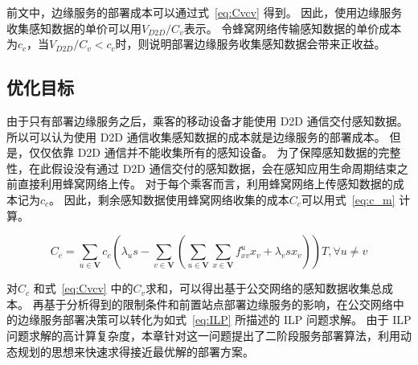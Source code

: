 前文中，边缘服务的部署成本可以通过式~\eqref{eq:Cvcv} 得到。
因此，使用边缘服务收集感知数据的单价可以用$V_{D2D}/C_v$表示。
令蜂窝网络传输感知数据的单价成本为$c_c$，当$V_{D2D}/C_v < c_c$时，则说明部署边缘服务收集感知数据会带来正收益。

\subsection{优化目标}

由于只有部署边缘服务之后，乘客的移动设备才能使用 D2D 通信交付感知数据。
所以可以认为使用 D2D 通信收集感知数据的成本就是边缘服务的部署成本。
但是，仅仅依靠 D2D 通信并不能收集所有的感知设备。
为了保障感知数据的完整性，在此假设没有通过 D2D 通信交付的感知数据，会在感知应用生命周期结束之前直接利用蜂窝网络上传。
对于每个乘客而言，利用蜂窝网络上传感知数据的成本记为$c_c$。
因此，剩余感知数据使用蜂窝网络收集的成本$C_c$可以用式~\eqref{eq:c_m} 计算。

\begin{equation}
\label{eq:c_m}
C_c = \sum_{u\in \boldsymbol{V}}c_c(\lambda_u s - \sum_{v\in \boldsymbol{V}}(\sum_{u\in \boldsymbol{V}}\sum_{x\in \boldsymbol{V}}f^u_{xv} x_v + \lambda_v s x_v))T, \forall u \neq v
\end{equation}

对$C_c$ 和式~\eqref{eq:Cvcv} 中的$C_v$求和，可以得出基于公交网络的感知数据收集总成本。
再基于分析得到的限制条件和前置站点部署边缘服务的影响，在公交网络中的边缘服务部署决策可以转化为如式~\eqref{eq:ILP} 所描述的 ILP 问题求解。
由于 ILP 问题求解的高计算复杂度，本章针对这一问题提出了二阶段服务部署算法，利用动态规划的思想来快速求得接近最优解的部署方案。



